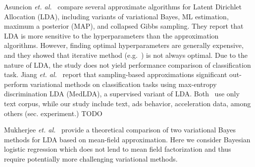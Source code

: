 
Asuncion {\it et. al.}~\cite{Asuncion2009smoothing} compare several
approximate algorithms for Latent Dirichlet Allocation (LDA), including
variants of variational Bayes, ML estimation, maximum a posterior (MAP), and
collapsed Gibbs sampling. They report that LDA is more sensitive to the
hyperparameters than the approximation algorithms. However, finding optimal
hyperparameters are generally expensive, and they showed that iterative method
(e.g.~\cite{Minka00}) is not always optimal. Due to the nature of LDA, the
study does not yield performance comparison of classification task. Jiang {\it
et. al.}~\cite{medlda_MCMC12} report that sampling-based approximations
significant out-perform variational methods on classification tasks using
max-entropy discrimination LDA (MedLDA), a supervised variant of LDA.
Both~\cite{Asuncion2009smoothing, medlda_MCMC12} use only text corpus, while
our study include text, ads behavior, acceleration data, among others (sec.
experiment.) TODO 

Mukherjee {\it et. al.}~\cite{Mukherjee08} provide a theoretical comparison of
two variational Bayes methods for LDA based on mean-field approximation. Here
we consider Bayesian logistic regression which does not lend to mean field
factorization and thus require potentially more challenging variational
methods. 

